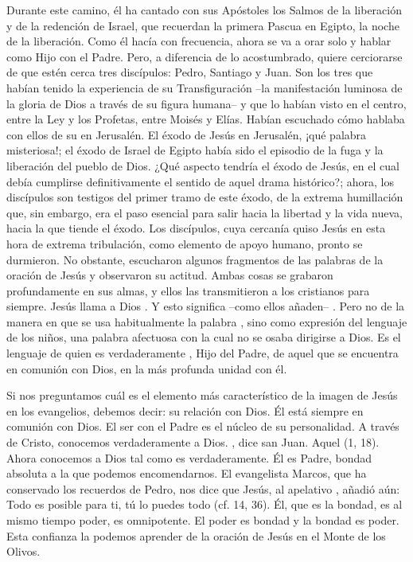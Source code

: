 \begin{body}
Durante este camino, él ha cantado con sus Apóstoles los Salmos de la liberación y de la redención de Israel, que recuerdan la primera Pascua en Egipto, la noche de la liberación. Como él hacía con frecuencia, ahora se va a orar solo y hablar como Hijo con el Padre. Pero, a diferencia de lo acostumbrado, quiere cerciorarse de que estén cerca tres discípulos: Pedro, Santiago y Juan. Son los tres que habían tenido la experiencia de su Transfiguración –la manifestación luminosa de la gloria de Dios a través de su figura humana– y que lo habían visto en el centro, entre la Ley y los Profetas, entre Moisés y Elías. Habían escuchado cómo hablaba con ellos de su  en Jerusalén. El éxodo de Jesús en Jerusalén, ¡qué palabra misteriosa!; el éxodo de Israel de Egipto había sido el episodio de la fuga y la liberación del pueblo de Dios. ¿Qué aspecto tendría el éxodo de Jesús, en el cual debía cumplirse definitivamente el sentido de aquel drama histórico?; ahora, los discípulos son testigos del primer tramo de este éxodo, de la extrema humillación que, sin embargo, era el paso esencial para salir hacia la libertad y la vida nueva, hacia la que tiende el éxodo. Los discípulos, cuya cercanía quiso Jesús en esta hora de extrema tribulación, como elemento de apoyo humano, pronto se durmieron. No obstante, escucharon algunos fragmentos de las palabras de la oración de Jesús y observaron su actitud. Ambas cosas se grabaron profundamente en sus almas, y ellos las transmitieron a los cristianos para siempre. Jesús llama a Dios . Y esto significa –como ellos añaden– . Pero no de la manera en que se usa habitualmente la palabra , sino como expresión del lenguaje de los niños, una palabra afectuosa con la cual no se osaba dirigirse a Dios. Es el lenguaje de quien es verdaderamente , Hijo del Padre, de aquel que se encuentra en comunión con Dios, en la más profunda unidad con él.

Si nos preguntamos cuál es el elemento más característico de la imagen de Jesús en los evangelios, debemos decir: su relación con Dios. Él está siempre en comunión con Dios. El ser con el Padre es el núcleo de su personalidad. A través de Cristo, conocemos verdaderamente a Dios. , dice san Juan. Aquel  (1, 18). Ahora conocemos a Dios tal como es verdaderamente. Él es Padre, bondad absoluta a la que podemos encomendarnos. El evangelista Marcos, que ha conservado los recuerdos de Pedro, nos dice que Jesús, al apelativo , añadió aún: Todo es posible para ti, tú lo puedes todo (cf. 14, 36). Él, que es la bondad, es al mismo tiempo poder, es omnipotente. El poder es bondad y la bondad es poder. Esta confianza la podemos aprender de la oración de Jesús en el Monte de los Olivos.


\end{body}
